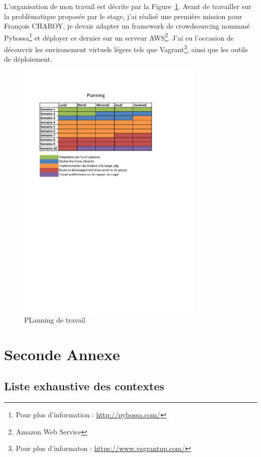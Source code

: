 \documentclass{tnreport}
\begin{document}
L'organisation de mon travail est décrite par la Figure~\ref{fig:planning}. Avant de travailler sur la problèmatique proposée par le stage, j'ai réalisé une première mission pour François CHAROY, je devais adapter un framework de crowdsourcing nommmé Pybossa\footnote{Pour plus d'information : \url{http://pybossa.com/}} et déployer ce dernier sur un serveur AWS\footnote{Amazon Web Service}. J'ai eu l'occasion de découvrir les environement virtuels légers tels que Vagrant\footnote{Pour plus d'informaton : \url{https://www.vagrantup.com/}}, ainsi que les outils de déploiement.

\begin{figure}[!h]
  \centering
  \includegraphics[width=9cm]{figures/planning}
  \caption{PLanning de travail}
  \label{fig:planning}
\end{figure}

\cleardoublepage

\chapter{Seconde Annexe}

\section{Liste exhaustive des contextes}
\label{sec:context}
\end{document}
